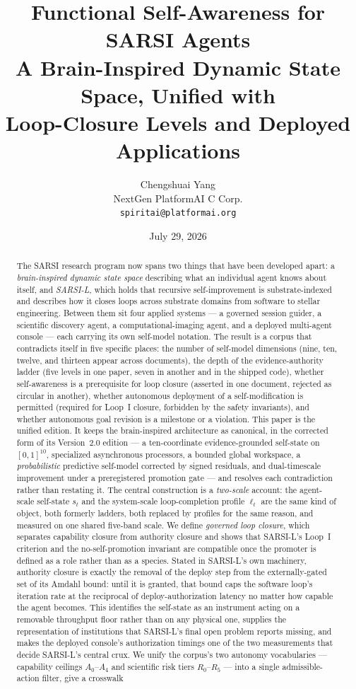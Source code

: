 \documentclass[11pt]{article}
\title{\LARGE Functional Self-Awareness for SARSI Agents\\[4pt]
\Large A Brain-Inspired Dynamic State Space, Unified with\\
\Large Loop-Closure Levels and Deployed Applications}
\author{Chengshuai Yang\\
NextGen PlatformAI C Corp.\\
\texttt{spiritai@platformai.org}}
\date{July 29, 2026}
\begin{document}
\maketitle
\thispagestyle{empty}

\begin{abstract}
\noindent
The SARSI research program now spans two things that have been developed apart: a \emph{brain-inspired dynamic state space} describing what an individual agent knows about itself, and \emph{SARSI-L}, which holds that recursive self-improvement is substrate-indexed and describes how it closes loops across substrate domains from software to stellar engineering. Between them sit four applied systems --- a governed session guider, a scientific discovery agent, a computational-imaging agent, and a deployed multi-agent console --- each carrying its own self-model notation. The result is a corpus that contradicts itself in five specific places: the number of self-model dimensions (nine, ten, twelve, and thirteen appear across documents), the depth of the evidence-authority ladder (five levels in one paper, seven in another and in the shipped code), whether self-awareness is a prerequisite for loop closure (asserted in one document, rejected as circular in another), whether autonomous deployment of a self-modification is permitted (required for Loop~I closure, forbidden by the safety invariants), and whether autonomous goal revision is a milestone or a violation. This paper is the unified edition. It keeps the brain-inspired architecture as canonical, in the corrected form of its Version~2.0 edition --- a ten-coordinate evidence-grounded self-state on $[0,1]^{10}$, specialized asynchronous processors, a bounded global workspace, a \emph{probabilistic} predictive self-model corrected by signed residuals, and dual-timescale improvement under a preregistered promotion gate --- and resolves each contradiction rather than restating it. The central construction is a \emph{two-scale} account: the agent-scale self-state $s_t$ and the system-scale loop-completion profile $\ell_t$ are the same kind of object, both formerly ladders, both replaced by profiles for the same reason, and measured on one shared five-band scale. We define \emph{governed loop closure}, which separates capability closure from authority closure and shows that SARSI-L's Loop~I criterion and the no-self-promotion invariant are compatible once the promoter is defined as a role rather than as a species. Stated in SARSI-L's own machinery, authority closure is exactly the removal of the deploy step from the externally-gated set of its Amdahl bound: until it is granted, that bound caps the software loop's iteration rate at the reciprocal of deploy-authorization latency no matter how capable the agent becomes. This identifies the self-state as an instrument acting on a removable throughput floor rather than on any physical one, supplies the representation of institutions that SARSI-L's final open problem reports missing, and makes the deployed console's authorization timings one of the two measurements that decide SARSI-L's central crux. We unify the corpus's two autonomy vocabularies --- capability ceilings $A_0$--$A_4$ and scientific risk tiers $R_0$--$R_5$ --- into a single admissible-action filter, give a crosswalk 
\end{abstract}
\end{document}
